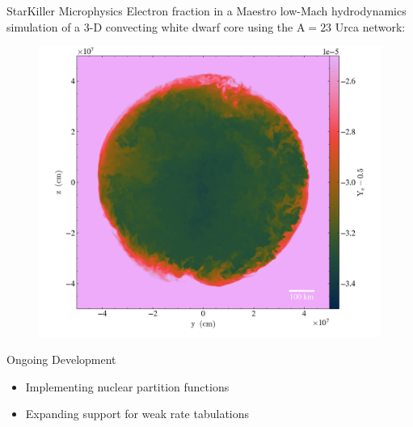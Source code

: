 \documentclass[final]{beamer}
\newlength{\onecolwid}
\newlength{\twocolwid}
\newcommand{\isot}[2]{$^{#2}\mathrm{#1}$}
\begin{document}
\begin{frame}[t]
\begin{columns}[t]
\begin{column}{\twocolwid}
\begin{columns}[t,totalwidth=\twocolwid]
\begin{column}{\onecolwid}
\begin{block}{StarKiller Microphysics}
Electron fraction in a Maestro low-Mach hydrodynamics simulation of a
3-D convecting white dwarf core using the $\mathrm{A=23}$ Urca network:

\begin{figure}
\includegraphics[width=\linewidth]{figures/starkiller-network/wd_4lev_Tc5-5e8_rhoc4-5e9_plt06605_slice_x_electron_fraction_asymmetry.png}
\end{figure}

\end{block}

\begin{block}{Ongoing Development}

\begin{itemize}
    \item Implementing nuclear partition functions
    \item Expanding support for weak rate tabulations
\end{itemize}



\end{block}
\end{column}
\end{columns}
\end{column}
\end{columns}
\end{frame}
\end{document}
